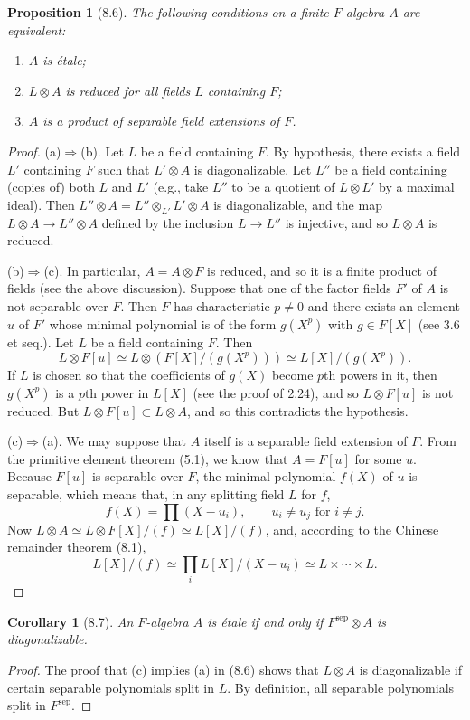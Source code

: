 \documentclass[UTF8,11pt]{ctexart}
\newtheorem*{proposition}{Proposition}
\newtheorem*{corollary}{Corollary}
\theoremstyle{definition}
\begin{document}
\begin{proposition}[8.6]
The following conditions on a finite $F$-algebra $A$ are equivalent:
\begin{enumerate}[label=(\alph*)]
\item $A$ is \'etale;
\item $L\otimes A$ is reduced for all fields $L$ containing $F$;
\item $A$ is a product of separable field extensions of $F$.
\end{enumerate}
\end{proposition}
\begin{proof}
(a)$\Rightarrow$(b). Let $L$ be a field containing $F$. By hypothesis, there exists a field $L'$ containing $F$ such that $L'\otimes A$ is diagonalizable. Let $L''$ be a field containing (copies of) both $L$ and $L'$ (e.g., take $L''$ to be a quotient of $L\otimes L'$ by a maximal ideal). Then $L''\otimes A=L''\otimes_{L'}L'\otimes A$ is diagonalizable, and the map $L\otimes A\to L''\otimes A$ defined by the inclusion $L\to L''$ is injective, and so $L\otimes A$ is reduced.

(b)$\Rightarrow$(c). In particular, $A=A\otimes F$ is reduced, and so it is a finite product of fields (see the above discussion). Suppose that one of the factor fields $F'$ of $A$ is not separable over $F$. Then $F$ has characteristic $p\ne0$ and there exists an element $u$ of $F'$ whose minimal polynomial is of the form $g(X^p)$ with $g\in F[X]$ (see 3.6 et seq.). Let $L$ be a field containing $F$. Then
\[L\otimes F[u]\simeq L\otimes(F[X]/(g(X^p)))\simeq L[X]/(g(X^p)).\]
If $L$ is chosen so that the coefficients of $g(X)$ become $p$th powers in it, then $g(X^p)$ is a $p$th power in $L[X]$ (see the proof of 2.24), and so $L\otimes F[u]$ is not reduced. But $L\otimes F[u]\subset L\otimes A$, and so this contradicts the hypothesis.

(c)$\Rightarrow$(a). We may suppose that $A$ itself is a separable field extension of $F$. From the primitive element theorem (5.1), we know that $A=F[u]$ for some $u$. Because $F[u]$ is separable over $F$, the minimal polynomial $f(X)$ of $u$ is separable, which means that, in any splitting field $L$ for $f$,
\[f(X)=\prod(X-u_i),\qquad u_i\ne u_j\text{ for }i\ne j.\]
Now $L\otimes A\simeq L\otimes F[X]/(f)\simeq L[X]/(f)$, and, according to the Chinese remainder theorem (8.1),
\[L[X]/(f)\simeq\prod_i L[X]/(X-u_i)\simeq L\times\cdots\times L.\]
\end{proof}
\begin{corollary}[8.7]
An $F$-algebra $A$ is \'etale if and only if $F^{\mathrm{sep}}\otimes A$ is diagonalizable.
\end{corollary}
\begin{proof}
The proof that (c) implies (a) in (8.6) shows that $L\otimes A$ is diagonalizable if certain separable polynomials split in $L$. By definition, all separable polynomials split in $F^{\mathrm{sep}}$.
\end{proof}
\end{document}
